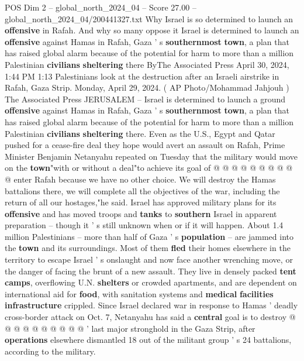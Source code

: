 \begin{textsample}{POS Dim 2 – global\_north\_2024\_04 – Score 27.00 – global\_north\_2024\_04/200441327.txt}  \label{ex:f2_pos_266}
Why Israel is so determined to launch an \textbf{offensive} in Rafah.
And why so many oppose it Israel is determined to launch an \textbf{offensive} against Hamas in Rafah, Gaza ' s \textbf{southernmost} \textbf{town}, a plan that has raised global alarm because of the potential for harm to more than a million Palestinian \textbf{civilians} \textbf{sheltering} there ByThe Associated Press April 30, 2024, 1:44 PM 1:13 Palestinians look at the destruction after an Israeli airstrike in Rafah, Gaza Strip.
Monday, April 29, 2024. ( AP Photo/Mohammad Jahjouh ) The Associated Press JERUSALEM -- Israel is determined to launch a ground \textbf{offensive} against Hamas in Rafah, Gaza ' s \textbf{southernmost} \textbf{town}, a plan that has raised global alarm because of the potential for harm to more than a million Palestinian \textbf{civilians} \textbf{sheltering} there.
Even as the U.S., Egypt and Qatar pushed for a cease-fire deal they hope would avert an assault on Rafah, Prime Minister Benjamin Netanyahu repeated on Tuesday that the military would move on the \textbf{town}"with or without a deal"to achieve its goal of @ @ @ @ @ @ @ @ @ @ enter Rafah because we have no other choice.
We will destroy the Hamas battalions there, we will complete all the objectives of the war, including the return of all our hostages,"he said.
Israel has approved military plans for its \textbf{offensive} and has moved troops and \textbf{tanks} to \textbf{southern} Israel in apparent preparation -- though it ' s still unknown when or if it will happen.
About 1.4 million Palestinians -- more than half of Gaza ' s \textbf{population} -- are jammed into the \textbf{town} and its surroundings.
Most of them \textbf{fled} their homes elsewhere in the territory to escape Israel ' s onslaught and now face another wrenching move, or the danger of facing the brunt of a new assault.
They live in densely packed \textbf{tent} \textbf{camps}, overflowing U.N. \textbf{shelters} or crowded apartments, and are dependent on international aid for \textbf{food}, with sanitation systems and \textbf{medical} \textbf{facilities} \textbf{infrastructure} crippled.
Since Israel declared war in response to Hamas ' deadly cross-border attack on Oct. 7, Netanyahu has said a \textbf{central} goal is to destroy @ @ @ @ @ @ @ @ @ @ ' last major stronghold in the Gaza Strip, after \textbf{operations} elsewhere dismantled 18 out of the militant group ' s 24 battalions, according to the military.

\end{textsample}
